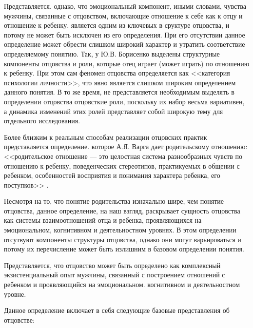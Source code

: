 \documentclass{../../common/thesisbyxetex}
\begin{document}
Представляется. однако, что эмоциональный компонент, иными словами, чувства мужчины, связанные с
отцовством, включающие отношение к себе как к отцу и отношение к ребенку, является одним из
ключевых в сруктуре отцовства, и потому не может быть исключен из его определения. При его
отсутствии данное определение может обрести слишком широкий характер и утратить соответствие
определяемому понятию. Так, у Ю.В. Борисенко выделены структурные компоненты отцовства и роли,
которые отец играет (может играть) по отношению к ребенку. При этом сам феномен отцовства
определяется как <<категория психологии
личности>>, что явно является слишком широким определением данного понятия. В то же время, не
представляется необходимым выделять в определении отцовства отцовсткие роли, поскольку их набор
весьма вариативен, а динамика изменений этих ролей представляет собой широкую тему для отдельного
исследования.

Более  близким к реальным способам реализации отцовских практик представляется определение. которое
А.Я. Варга дает родительскому отношению: <<родительское отношение --- это целостная система
разнообразных чувств по отношению к ребенку, поведенческих стереотипов, практикуемых в общении с
ребенком, особенностей восприятия и понимания характера ребенка, его поступков>> \cite[7]{varga}.

Несмотря на то, что понятие родительства изначально шире, чем понятие отцовства, данное
определение, на наш взгляд, раскрывает сущность отцовства как системы взаимоотношений отца и
ребенка, проявляющихся на эмоциональном, когнитивном и деятельностном уровнях.  В этом определении
отсутвуют компоненты структуры отцовства, однако они могут варьироваться и потому их перечисление
может быть излишним в базовом определении понятия.

Представляется, что отцовство может быть определено как комплексный экзистенциальный опыт мужчины,
связанный с построением отношений с ребенком и проявляющийся на эмоциональном.
когнитивном и деятельностном уровне.

Данное определение включает в себя следующие базовые представления об отцовстве:
\end{document}
